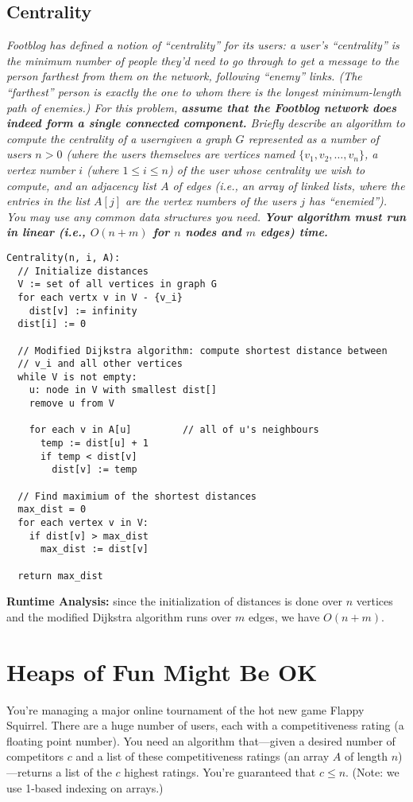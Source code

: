 \documentclass[11pt, oneside]{article}   	%
\theoremstyle{definition}
\theoremstyle{remark}
\begin{document}
\subsection{Centrality}
\textit{Footblog has defined a notion of ``centrality'' for its users: a user's ``centrality'' is the minimum number of people they'd need to go through to get a message to the person farthest from them on the network, following ``enemy'' links. (The ``farthest'' person is exactly the one to whom there is the longest minimum-length path of enemies.) For this problem, \textbf{assume that the Footblog network does indeed form a single connected component.} Briefly describe an algorithm to compute the centrality of a userngiven a graph $G$ represented as a number of users $n > 0$ (where the users themselves are vertices named $\{v_1, v_2, \ldots, v_n\}$, a vertex number $i$ (where $1 \leq i \leq n$) of the user whose centrality we wish to compute, and an adjacency list $A$ of edges (i.e., an array of linked lists, where the entries in the list $A[j]$ are the vertex numbers of the users $j$ has ``enemied''). You may use any common data structures you need. \textbf{Your algorithm must run in linear (i.e., $O(n + m)$ for $n$ nodes and $m$ edges) time.}}
\begin{verbatim}
Centrality(n, i, A):
  // Initialize distances
  V := set of all vertices in graph G
  for each vertx v in V - {v_i}
    dist[v] := infinity
  dist[i] := 0
  
  // Modified Dijkstra algorithm: compute shortest distance between
  // v_i and all other vertices
  while V is not empty:
    u: node in V with smallest dist[]
    remove u from V
    
    for each v in A[u]		   // all of u's neighbours
      temp := dist[u] + 1
      if temp < dist[v]
        dist[v] := temp
  
  // Find maximium of the shortest distances
  max_dist = 0
  for each vertex v in V:
    if dist[v] > max_dist
      max_dist := dist[v]
    
  return max_dist
\end{verbatim}
\textbf{Runtime Analysis:} since the initialization of distances is done over $n$ vertices and the modified Dijkstra algorithm runs over $m$ edges, we have $O(n+m)$.


\cleardoublepage
\section{Heaps of Fun Might Be OK}
You're managing a major online tournament of the hot new game Flappy
Squirrel. There are a huge number of users, each with a
competitiveness rating (a floating point number). You need an
algorithm that---given a desired number of competitors $c$ and a list
of these competitiveness ratings (an array $A$ of length
$n$)---returns a list of the $c$ highest ratings. You're guaranteed
that $c \leq n$. (Note: we use 1-based indexing on arrays.)
\end{document}
